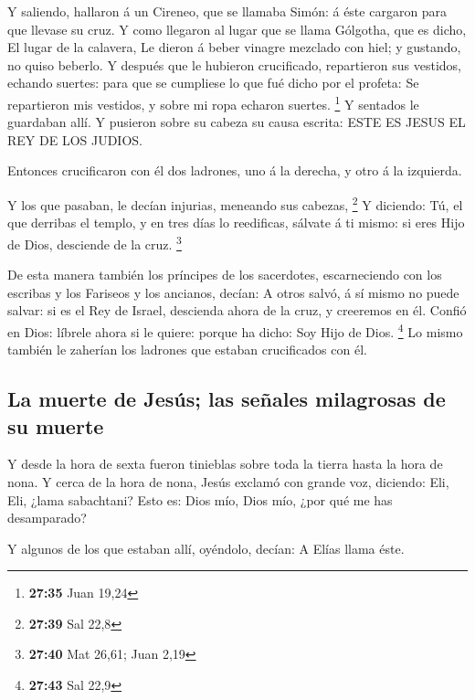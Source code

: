 Y saliendo, hallaron á un Cireneo, que se llamaba Simón: á
éste cargaron para que llevase su cruz.  Y como llegaron al
lugar que se llama Gólgotha, que es dicho, El lugar de la calavera,
 Le dieron á beber vinagre mezclado con hiel; y gustando,
no quiso beberlo.  Y después que le hubieron crucificado,
repartieron sus vestidos, echando suertes: para que se cumpliese lo que
fué dicho por el profeta: Se repartieron mis vestidos, y sobre mi ropa
echaron suertes. \footnote{\textbf{27:35} Juan 19,24}  Y
sentados le guardaban allí.  Y pusieron sobre su cabeza su
causa escrita: ESTE ES JESUS EL REY DE LOS JUDIOS.

 Entonces crucificaron con él dos ladrones, uno á la
derecha, y otro á la izquierda.

 Y los que pasaban, le decían injurias, meneando sus
cabezas, \footnote{\textbf{27:39} Sal 22,8}  Y diciendo:
Tú, el que derribas el templo, y en tres días lo reedificas, sálvate á
ti mismo: si eres Hijo de Dios, desciende de la cruz. \footnote{\textbf{27:40}
  Mat 26,61; Juan 2,19}

 De esta manera también los príncipes de los sacerdotes,
escarneciendo con los escribas y los Fariseos y los ancianos, decían:
 A otros salvó, á sí mismo no puede salvar: si es el Rey de
Israel, descienda ahora de la cruz, y creeremos en él. 
Confió en Dios: líbrele ahora si le quiere: porque ha dicho: Soy Hijo de
Dios. \footnote{\textbf{27:43} Sal 22,9}  Lo mismo también
le zaherían los ladrones que estaban crucificados con él.

\hypertarget{la-muerte-de-jesuxfas-las-seuxf1ales-milagrosas-de-su-muerte}{%
\subsection{La muerte de Jesús; las señales milagrosas de su
muerte}\label{la-muerte-de-jesuxfas-las-seuxf1ales-milagrosas-de-su-muerte}}

 Y desde la hora de sexta fueron tinieblas sobre toda la
tierra hasta la hora de nona.  Y cerca de la hora de nona,
Jesús exclamó con grande voz, diciendo: Eli, Eli, ¿lama sabachtani? Esto
es: Dios mío, Dios mío, ¿por qué me has desamparado?

 Y algunos de los que estaban allí, oyéndolo, decían: A
Elías llama éste.

